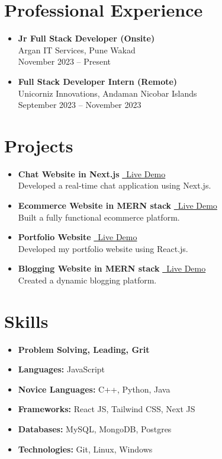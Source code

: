 \documentclass[a4paper,11pt]{article}
\begin{document}
\section*{Professional Experience}
\begin{itemize}[leftmargin=*]
    \item \textbf{Jr Full Stack Developer (Onsite)} \\
    Argan IT Services, Pune Wakad \\
    November 2023 – Present
    \item \textbf{Full Stack Developer Intern (Remote)} \\
    Unicorniz Innovations, Andaman Nicobar Islands \\
    September 2023 – November 2023
\end{itemize}

\section*{Projects}
\begin{itemize}[leftmargin=*]
    \item \textbf{Chat Website in Next.js} \hfill \href{https://thunder-chat-navy.vercel.app/}{\small\faExternalLink\ Live Demo} \\
    Developed a real-time chat application using Next.js.
    \item \textbf{Ecommerce Website in MERN stack} \hfill \href{https://onestopshop-tzua.onrender.com/}{\small\faExternalLink\ Live Demo} \\
    Built a fully functional ecommerce platform.
    \item \textbf{Portfolio Website} \hfill \href{https://okdev.vercel.app/}{\small\faExternalLink\ Live Demo} \\
    Developed my portfolio website using React.js.
    \item \textbf{Blogging Website in MERN stack} \hfill \href{https://magicalwind.onrender.com/}{\small\faExternalLink\ Live Demo} \\
    Created a dynamic blogging platform.
\end{itemize}

\section*{Skills}
\begin{itemize}[leftmargin=*]
    \item \textbf{Problem Solving, Leading, Grit}
    \item \textbf{Languages:} JavaScript
    \item \textbf{Novice Languages:} C++, Python, Java
    \item \textbf{Frameworks:} React JS, Tailwind CSS, Next JS
    \item \textbf{Databases:} MySQL, MongoDB, Postgres
    \item \textbf{Technologies:} Git, Linux, Windows
\end{itemize}
\end{document}
